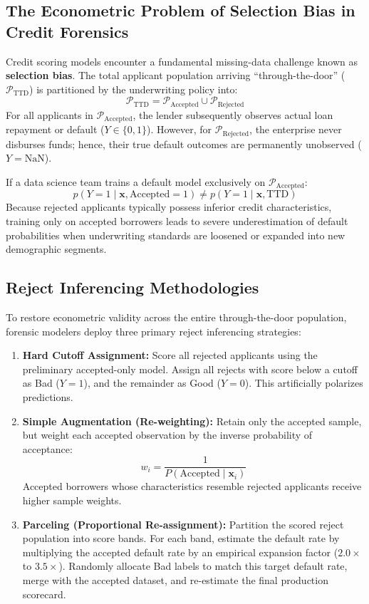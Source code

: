 \subsection{The Econometric Problem of Selection Bias in Credit Forensics}
Credit scoring models encounter a fundamental missing-data challenge known as \textbf{selection bias}. The total applicant population arriving ``through-the-door'' ($\mathcal{P}_{\text{TTD}}$) is partitioned by the underwriting policy into:
\begin{equation}
\mathcal{P}_{\text{TTD}} = \mathcal{P}_{\text{Accepted}} \cup \mathcal{P}_{\text{Rejected}}
\end{equation}
For all applicants in $\mathcal{P}_{\text{Accepted}}$, the lender subsequently observes actual loan repayment or default ($Y \in \{0, 1\}$). However, for $\mathcal{P}_{\text{Rejected}}$, the enterprise never disburses funds; hence, their true default outcomes are permanently unobserved ($Y = \text{NaN}$).

If a data science team trains a default model exclusively on $\mathcal{P}_{\text{Accepted}}$:
\begin{equation}
p(Y=1 \mid \mathbf{x}, \text{Accepted}=1) \ne p(Y=1 \mid \mathbf{x}, \text{TTD})
\end{equation}
Because rejected applicants typically possess inferior credit characteristics, training only on accepted borrowers leads to severe underestimation of default probabilities when underwriting standards are loosened or expanded into new demographic segments.

\subsection{Reject Inferencing Methodologies}
To restore econometric validity across the entire through-the-door population, forensic modelers deploy three primary reject inferencing strategies:
\begin{enumerate}
    \item \textbf{Hard Cutoff Assignment:} Score all rejected applicants using the preliminary accepted-only model. Assign all rejects with score below a cutoff as Bad ($Y=1$), and the remainder as Good ($Y=0$). This artificially polarizes predictions.
    \item \textbf{Simple Augmentation (Re-weighting):} Retain only the accepted sample, but weight each accepted observation by the inverse probability of acceptance:
    \begin{equation}
    w_i = \frac{1}{P(\text{Accepted} \mid \mathbf{x}_i)}
    \end{equation}
    Accepted borrowers whose characteristics resemble rejected applicants receive higher sample weights.
    \item \textbf{Parceling (Proportional Re-assignment):} Partition the scored reject population into score bands. For each band, estimate the default rate by multiplying the accepted default rate by an empirical expansion factor ($2.0 \times$ to $3.5 \times$). Randomly allocate Bad labels to match this target default rate, merge with the accepted dataset, and re-estimate the final production scorecard.
\end{enumerate}


